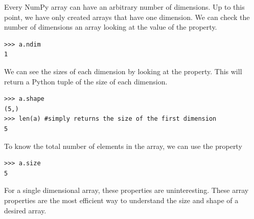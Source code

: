 Every NumPy array can have an arbitrary number of dimensions.  
Up to this point, we have only created arrays that have one dimension.
We can check the number of dimensions an array looking at the value of the  property.
\begin{lstlisting}
>>> a.ndim
1
\end{lstlisting}
We can see the sizes of each dimension by looking at the  property.
This will return a Python tuple of the size of each dimension.
\begin{lstlisting}
>>> a.shape
(5,)
>>> len(a) #simply returns the size of the first dimension
5
\end{lstlisting}
To know the total number of elements in the array, we can use the  property
\begin{lstlisting}
>>> a.size
5
\end{lstlisting}
For a single dimensional array, these properties are uninteresting.
These array properties are the most efficient way to understand the size and shape of a desired array.

